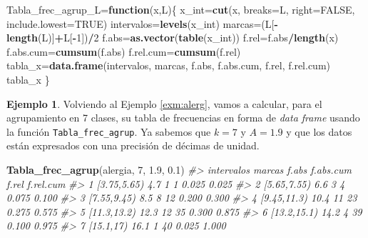 \documentclass[
]{book}
\newenvironment{Shaded}{\begin{snugshade}}{\end{snugshade}}
\newcommand{\CommentTok}[1]{\textcolor[rgb]{0.56,0.35,0.01}{\textit{#1}}}
\newcommand{\ControlFlowTok}[1]{\textcolor[rgb]{0.13,0.29,0.53}{\textbf{#1}}}
\newcommand{\DataTypeTok}[1]{\textcolor[rgb]{0.13,0.29,0.53}{#1}}
\newcommand{\DecValTok}[1]{\textcolor[rgb]{0.00,0.00,0.81}{#1}}
\newcommand{\FloatTok}[1]{\textcolor[rgb]{0.00,0.00,0.81}{#1}}
\newcommand{\KeywordTok}[1]{\textcolor[rgb]{0.13,0.29,0.53}{\textbf{#1}}}
\newcommand{\NormalTok}[1]{#1}
\newcommand{\OperatorTok}[1]{\textcolor[rgb]{0.81,0.36,0.00}{\textbf{#1}}}
\newcommand{\OtherTok}[1]{\textcolor[rgb]{0.56,0.35,0.01}{#1}}
\theoremstyle{definition}
\theoremstyle{definition}
\newtheorem{example}{Ejemplo}[chapter]
\theoremstyle{definition}
\theoremstyle{remark}
\begin{document}
\begin{Shaded}
\begin{Highlighting}[]
\NormalTok{Tabla\_frec\_agrup\_L=}\ControlFlowTok{function}\NormalTok{(x,L)\{}
\NormalTok{    x\_int=}\KeywordTok{cut}\NormalTok{(x, }\DataTypeTok{breaks=}\NormalTok{L, }\DataTypeTok{right=}\OtherTok{FALSE}\NormalTok{, }\DataTypeTok{include.lowest=}\OtherTok{TRUE}\NormalTok{)}
\NormalTok{    intervalos=}\KeywordTok{levels}\NormalTok{(x\_int)}
\NormalTok{    marcas=(L[}\OperatorTok{{-}}\KeywordTok{length}\NormalTok{(L)]}\OperatorTok{+}\NormalTok{L[}\OperatorTok{{-}}\DecValTok{1}\NormalTok{])}\OperatorTok{/}\DecValTok{2}
\NormalTok{    f.abs=}\KeywordTok{as.vector}\NormalTok{(}\KeywordTok{table}\NormalTok{(x\_int))}
\NormalTok{    f.rel=f.abs}\OperatorTok{/}\KeywordTok{length}\NormalTok{(x)}
\NormalTok{    f.abs.cum=}\KeywordTok{cumsum}\NormalTok{(f.abs)}
\NormalTok{    f.rel.cum=}\KeywordTok{cumsum}\NormalTok{(f.rel)}
\NormalTok{    tabla\_x=}\KeywordTok{data.frame}\NormalTok{(intervalos, marcas, f.abs, f.abs.cum, f.rel, f.rel.cum)}
\NormalTok{    tabla\_x}
\NormalTok{  \}}
\end{Highlighting}
\end{Shaded}

\begin{example}
\protect\hypertarget{exm:unnamed-chunk-48}{}{\label{exm:unnamed-chunk-48} }Volviendo al Ejemplo \ref{exm:alerg}, vamos a calcular, para el agrupamiento en 7 clases, su tabla de frecuencias en forma de \emph{data frame} usando la función \texttt{Tabla\_frec\_agrup}. Ya sabemos que \(k=7\) y \(A=1.9\) y que los datos están expresados con una precisión de décimas de unidad.
\end{example}

\begin{Shaded}
\begin{Highlighting}[]
\KeywordTok{Tabla\_frec\_agrup}\NormalTok{(alergia, }\DecValTok{7}\NormalTok{, }\FloatTok{1.9}\NormalTok{, }\FloatTok{0.1}\NormalTok{)}
\CommentTok{\#\textgreater{}    intervalos marcas f.abs f.abs.cum f.rel f.rel.cum}
\CommentTok{\#\textgreater{} 1 [3.75,5.65)    4.7     1         1 0.025     0.025}
\CommentTok{\#\textgreater{} 2 [5.65,7.55)    6.6     3         4 0.075     0.100}
\CommentTok{\#\textgreater{} 3 [7.55,9.45)    8.5     8        12 0.200     0.300}
\CommentTok{\#\textgreater{} 4 [9.45,11.3)   10.4    11        23 0.275     0.575}
\CommentTok{\#\textgreater{} 5 [11.3,13.2)   12.3    12        35 0.300     0.875}
\CommentTok{\#\textgreater{} 6 [13.2,15.1)   14.2     4        39 0.100     0.975}
\CommentTok{\#\textgreater{} 7   [15.1,17)   16.1     1        40 0.025     1.000}
\end{Highlighting}
\end{Shaded}
\end{document}
